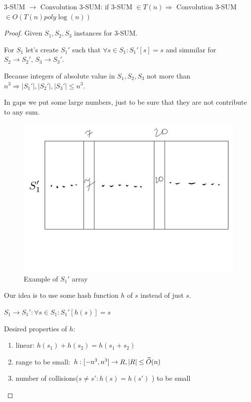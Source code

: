 \begin{thm}
  3-SUM $\to$ Convolution 3-SUM: if 3-SUM $\in T(n) \Longrightarrow$ Convolution 3-SUM $\in O(T(n) poly \log(n))$
\end{thm}
\begin{proof}
  Given $S_1, S_2, S_3$ instances for 3-SUM.

  For $S_1$ let's create $S_1'$ such that $\forall s \in S_1 : S_1'[s] = s$
  and simmilar for $S_2 \to S_2', \, S_3 \to S_3'$.

  Because integers of absolute value in $S_1, S_2, S_3$ not more than $n^3 \Longrightarrow |S_1'|, |S_2'|, |S_3'| \leq n^3$.

  In gaps we put some large numbers, just to be sure that they are not contribute to any sum.

  \begin{figure}[ht]
	\center
	\includegraphics[scale=0.3]{figures/1.pdf}
	\caption{Example of $S_1'$ array}
  \end{figure}

  Our idea is to use some hash function $h$ of $s$ instead of just $s$.

  $S_1 \to S_1' : \forall s \in S_1 : S_1'[h(s)] = s$

  Desired properties of $h$:
  \begin{enumerate}
	\item linear: $h(s_1) + h(s_2) = h(s_1 + s_2)$
	\item range to be small: $h: [-n^3, n^3] \to R, |R| \leq \widetilde{O}(n)$
	\item number of collisions($s \neq s' : h(s) = h(s')$ ) to be small
  \end{enumerate}


\end{proof}
